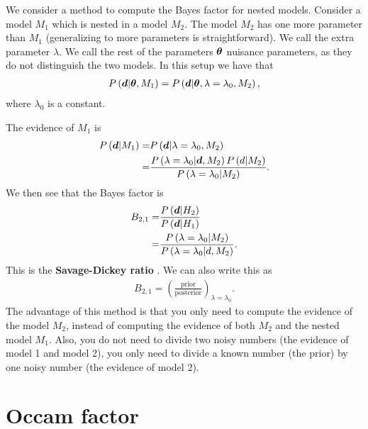 We consider a method to compute the Bayes factor for nested models. 
Consider a model $M_1$ which is nested in a model $M_2$.
The model $M_2$ has one more parameter than $M_1$ 
(generalizing to more parameters is straightforward).
We call the extra parameter $\lambda$.
We call the rest of the parameters ${\bm \theta}$ nuisance parameters,
as they do not distinguish the two models. 
In this setup we have that
\begin{align}
    P\left({\bm d}|{\bm \theta},M_1\right)
    =
    P\left({\bm d}|{\bm \theta},\lambda=\lambda_0,M_2\right)
    ,
\end{align}
where $\lambda_0$ is a constant.

The evidence of $M_1$ is
\begin{align}
    P\left({\bm d}|M_1\right)
    =&
    P\left({\bm d}|\lambda=\lambda_0,M_2\right)
    \nonumber\\
    =&
    \frac{
        P\left(\lambda=\lambda_0|{\bm d},M_2\right)P\left(d|M_2\right)
    }{
        P\left(\lambda=\lambda_0|M_2\right)
    } 
    .
\end{align}
We then see that the Bayes factor is
\begin{align}
    B_{2,1}
    =&
    \frac{P\left({\bm d}|H_2\right)}{P\left({\bm d}|H_1\right)}
    \nonumber\\
    =&
    \frac{
        P\left(\lambda=\lambda_0|M_2\right)
    }{
        P\left(\lambda=\lambda_0|d,M_2\right)
    }
    .
\end{align}
This is the \textbf{Savage-Dickey ratio} \cite{dickey-lientz-savage-dicke-ratio}.
We can also write this as
\begin{align}
    B_{2,1}
    =
    \left(\frac{\mathrm{prior}}{\mathrm{posterior}}\right)_{\lambda=\lambda_0}
    .
\end{align}
The advantage of this method is that you only need to compute the
evidence of the model $M_2$, instead of computing the evidence of both 
$M_2$ and the nested model $M_1$.
Also, you do not need to divide two noisy numbers (the evidence of
model 1 and model 2), you only need to divide a known number
(the prior) by one noisy number (the evidence of model 2).


\section{Occam factor}

